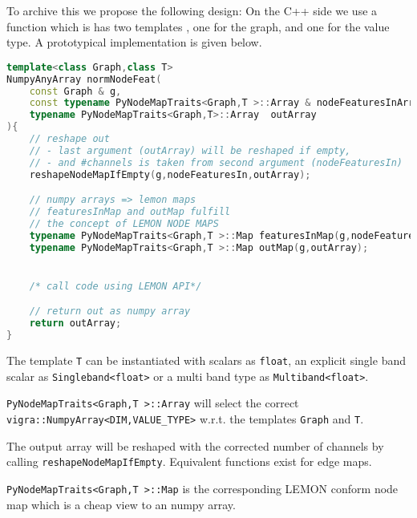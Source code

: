 \begin{minipage}{\textwidth}

To archive this we propose the following design:
On the C++ side we use a function  which
is has two templates , one for the graph, and one for the value type.
A prototypical implementation is given below.

\begin{lstlisting}[language=c++]
template<class Graph,class T>
NumpyAnyArray normNodeFeat(
    const Graph & g,
    const typename PyNodeMapTraits<Graph,T >::Array & nodeFeaturesInArray,
    typename PyNodeMapTraits<Graph,T>::Array  outArray 
){
    // reshape out 
    // - last argument (outArray) will be reshaped if empty,
    // - and #channels is taken from second argument (nodeFeaturesIn) 
    reshapeNodeMapIfEmpty(g,nodeFeaturesIn,outArray);

    // numpy arrays => lemon maps 
    // featuresInMap and outMap fulfill
    // the concept of LEMON NODE MAPS
    typename PyNodeMapTraits<Graph,T >::Map featuresInMap(g,nodeFeaturesInArray);
    typename PyNodeMapTraits<Graph,T >::Map outMap(g,outArray);


    /* call code using LEMON API*/

    // return out as numpy array
    return outArray;
}
\end{lstlisting}

The template \lstinline{T} can be instantiated with scalars as \lstinline{float}, an explicit single band scalar as \lstinline{Singleband<float>}
or a multi band type as \lstinline{Multiband<float>}.

\lstinline{PyNodeMapTraits<Graph,T >::Array} will select the correct \lstinline{vigra::NumpyArray<DIM,VALUE_TYPE>} w.r.t.
the templates \lstinline{Graph} and \lstinline{T}.

The output array will be reshaped with the corrected number of channels by calling \lstinline{reshapeNodeMapIfEmpty}.
Equivalent functions exist for edge maps.

\lstinline{PyNodeMapTraits<Graph,T >::Map} is the corresponding LEMON conform  node map 
which is a cheap view to an numpy array. 
\end{minipage}


